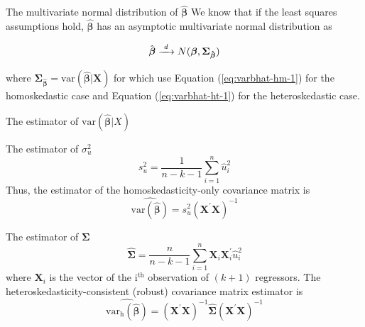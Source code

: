 \documentclass[presentation,10pt]{beamer}
\newcommand{\var}{\mathrm{var}}
\newcommand{\rarrowd}[1]{\xrightarrow{\text{ \textit #1 }}}
\begin{document}
\begin{frame}[label={sec:orge801c2d}]{The multivariate normal distribution of \(\hat{\mathbf{\beta}}\)}
We know that if the least squares assumptions hold,
\(\hat{\boldsymbol{\beta}}\) has an asymptotic multivariate normal
distribution as

\begin{equation}
\label{eq:normal-bhat-m}
\hat{\boldsymbol{\beta}} \rarrowd{d} N(\boldsymbol{\beta}, \boldsymbol{\Sigma_{\hat{\boldsymbol{\beta}}}})
\end{equation}

where \(\boldsymbol{\Sigma_{\hat{\boldsymbol{\beta}}}} =
\var(\hat{\boldsymbol{\beta}} | \mathbf{X})\) for which use
Equation (\ref{eq:varbhat-hm-1}) for the homoskedastic case and Equation
(\ref{eq:varbhat-ht-1}) for the heteroskedastic case.
\end{frame}

\begin{frame}[label={sec:orga371acf}]{The estimator of \(\var(\hat{\boldsymbol{\beta}}|X)\)}
\begin{block}{The estimator of \(\sigma^2_u\)}
\begin{equation}
\label{eq:sigma2u}
s^2_u = \frac{1}{n-k-1} \sum_{i=1}^n \hat{u}^2_i
\end{equation}
Thus, the estimator of the homoskedasticity-only covariance matrix
is
\begin{equation}
\label{eq:hat-vbhat-hm}
\widehat{\var(\hat{\boldsymbol{\beta}})} = s^2_u (\mathbf{X}^{\prime} \mathbf{X})^{-1}
\end{equation}
\end{block}

\begin{block}{The estimator of \(\boldsymbol{\Sigma}\)}
\begin{equation}
\label{eq:Sigmahat}
\widehat{\boldsymbol{\Sigma}} = \frac{n}{n-k-1} \sum_{i=1}^n
\mathbf{X}_i \mathbf{X}_i^{\prime} \hat{u}^2_i
\end{equation}
where \(\mathbf{X}_i\) is the vector of the i\(^{\text{th}}\)
observation of \((k+1)\) regressors. 
The \alert{heteroskedasticity-consistent (robust) covariance matrix estimator} is
\begin{equation}
\label{eq:hat-vbhat-ht}
\widehat{\var_{\mathrm{h}}(\hat{\boldsymbol{\beta}})} = \left(\mathbf{X}^{\prime} \mathbf{X}\right)^{-1} \widehat{\boldsymbol{\Sigma}} (\mathbf{X}^{\prime} \mathbf{X})^{-1}
\end{equation}
\end{block}
\end{frame}
\end{document}
